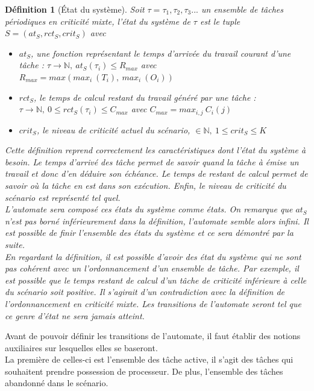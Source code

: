 \documentclass[11pt,a4paper,oneside]{book}
\theoremstyle{break}
\newtheorem{defin}{Définition}
\theoremstyle{breakplain}
\begin{document}
\begin{defin}[État du système]
Soit $\tau = \tau_1, \tau_2, \tau_3 ...$ un ensemble de tâches périodiques en criticité mixte, l'état du système de $\tau$ est le tuple $S = (at_S, rct_S, crit_S)$ avec

\begin{itemize}
\item $at_S$, une fonction représentant le temps d'arrivée du travail courant d'une tâche : $\tau \rightarrow \mathbb{N},\ at_S(\tau_i) \leq R_{max}$ avec $R_{max} = max(max_i\ (T_i),\ max_i\ (O_i))$
\item $rct_S$, le temps de calcul restant du travail généré par une tâche : $ \tau \rightarrow \mathbb{N},\ 0 \leq rct_S(\tau_i) \leq C_{max}$ avec $C_{max} = max_{i,j}\ C_i(j)$
\item $crit_S$, le niveau de criticité actuel du scénario, $ \in \mathbb{N},\ 1 \leq crit_S \leq K$

\end{itemize}


Cette définition reprend correctement les caractéristiques dont l'état du système à besoin. Le temps d'arrivé des tâche permet de savoir quand la tâche à émise un travail et donc d'en déduire son échéance. Le temps de restant de calcul permet de savoir où la tâche en est dans son exécution. Enfin, le niveau de criticité du scénario est représenté tel quel.\\

L'automate sera composé ces états du système comme états. On remarque que $at_S$ n'est pas borné inférieurement dans la définition, l'automate semble alors infini. Il est possible de finir l'ensemble des états du système et ce sera démontré par la suite.\\
En regardant la définition, il est possible d'avoir des état du système qui ne sont pas cohérent avec un l'ordonnancement d'un ensemble de tâche. Par exemple, il est possible que le temps restant de calcul d'un tâche de criticité inférieure à celle du scénario soit positive. Il s'agirait d'un contradiction avec la définition de l'ordonnancement en criticité mixte. Les transitions de l'automate seront tel que ce genre d'état ne sera jamais atteint.

\end{defin}

Avant de pouvoir définir les transitions de l'automate, il faut établir des notions auxiliaires sur lesquelles elles se baseront.\\
La première de celles-ci est l'ensemble des tâche active, il s'agit des tâches qui souhaitent prendre possession de processeur. De plus, l'ensemble des tâches abandonné dans le scénario. 
\end{document}
